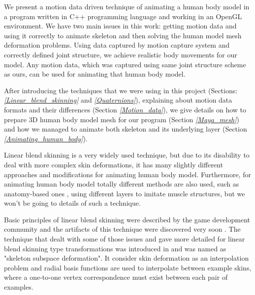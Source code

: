 \documentclass[times, 10pt,twocolumn]{article}
\begin{document}

We present a motion data driven technique of animating a human body model in a program written in C++ programming language and working in an OpenGL environment.
We have two main issues in this work: getting motion data and using it
correctly to animate skeleton and then solving the human model mesh deformation problems.
Using data captured by motion capture system and correctly defined joint structure,
we achieve realistic body movements for our model. Any motion data, which was captured
using same joint structure scheme as ours, can be used for animating that human body model.

After introducing the techniques that we were using in this project (Sections: \emph{\ref{Linear_blend_skinning}} and \emph{\ref{Quaternions}}), explaining about motion data formats and their differences (Section \emph{\ref{Motion_data}}), we give details on how to prepare 3D human body model mesh for our program (Section \emph{\ref{Maya_mesh}}) and how we managed to animate both skeleton and its underlying layer (Section \emph{\ref{Animating_human_body}}).



Linear blend skinning is a very widely used technique, but due to its disability to deal with more complex skin deformations, it has many slightly different approaches and modifications for animating human body model. Furthermore, for animating human body model totally different methods are also used, such as anatomy-based ones \cite{ex8}, using different layers to imitate muscle structures, but we won't be going to details of such a technique.

Basic principles of linear blend skinning were described by the game development community \cite{ex13,ex14,ex10} and the artifacts of this technique were discovered very soon \cite{ex15}.
The technique that dealt with some of those issues and gave more detailed for linear blend skinning type transformations was introduced in \cite{ex12} and was named as "skeleton subspace deformation". It consider skin deformation as an interpolation problem and radial basis functions are used to interpolate between example skins, where a one-to-one vertex correspondence must exist between each pair of examples.
\end{document}
